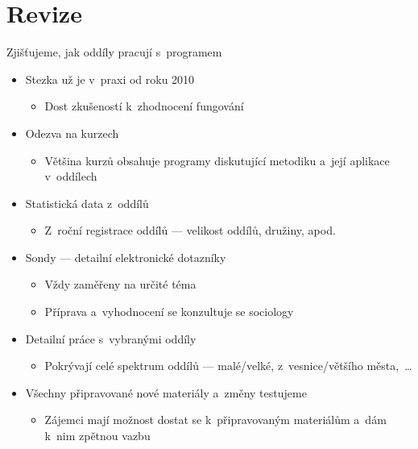 \documentclass[compress, ucs, xelatex, xcolor=dvipsnames, print,
  hyperref={
    bookmarks=true,
    unicode=true,
    colorlinks=true,
    plainpages=false,
    pdfkeywords={Skaut, Junak, Skauting, Vychovna metoda},
    linkcolor=Black,
    anchorcolor=Black,
    citecolor=OliveGreen,
    filecolor=OliveGreen,
    menucolor=Black,
    urlcolor=OliveGreen,
    pdftex}
  ]{beamer}
\begin{document}
\section{Revize}

\begin{frame}{Zjišťujeme, jak oddíly pracují s~programem}
  \begin{itemize}
    \item Stezka už je v~praxi od roku 2010
    \begin{itemize}
      \item Dost zkušeností k~zhodnocení fungování
    \end{itemize}
    \item Odezva na kurzech
    \begin{itemize}
      \item Většina kurzů obsahuje programy diskutující metodiku a~její aplikace v~oddílech
    \end{itemize}
    \item Statistická data z~oddílů
    \begin{itemize}
      \item Z~roční registrace oddílů --- velikost oddílů, družiny, apod.
    \end{itemize}
    \item Sondy --- detailní elektronické dotazníky
    \begin{itemize}
      \item Vždy zaměřeny na určité téma
      \item Příprava a~vyhodnocení se konzultuje se sociology
    \end{itemize}
    \item Detailní práce s~vybranými oddíly
    \begin{itemize}
      \item Pokrývají celé spektrum oddílů --- malé/velké, z~vesnice/většího města,~\ldots
    \end{itemize}
    \item Všechny připravované nové materiály a~změny testujeme
    \begin{itemize}
      \item Zájemci mají možnost dostat se k~připravovaným materiálům a~dám k~nim zpětnou vazbu
    \end{itemize}
  \end{itemize}
\end{frame}
\end{document}

